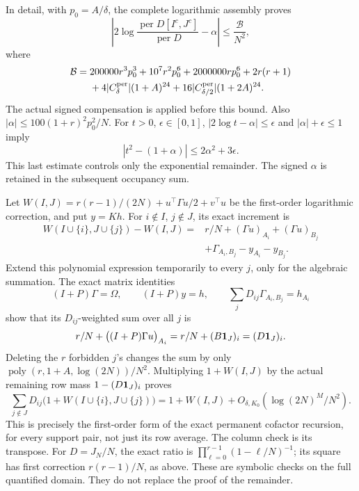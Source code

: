 In detail, with \(p_0=A/\delta\), the complete logarithmic
assembly proves
\[
 \left|2\log\frac{\operatorname{per}D[I^c,J^c]}
                       {\operatorname{per}D}-\alpha\right|
       \leq \frac{\mathcal B}{N^2},
\]
where
\[
 \begin{split}
 \mathcal B={}&200000r^3p_0^3+10^7r^2p_0^6
           +2000000rp_0^6+2r(r+1)\\
       &+4|C_\delta^{\rm per}|(1+A)^{24}
           +16|C_{\delta/2}^{\rm per}|(1+2A)^{24}.
 \end{split}
\]
The actual signed compensation is applied before this bound.
Also \(|\alpha|\leq100(1+r)^2p_0^2/N\).
For \(t>0\), \(\epsilon\in[0,1]\),
\(|2\log t-\alpha|\leq\epsilon\) and
\(|\alpha|+\epsilon\leq1\) imply
\[
 |t^2-(1+\alpha)|\leq2\alpha^2+3\epsilon .
\]
This last estimate controls only the exponential remainder.
The signed \(\alpha\) is retained in the subsequent occupancy sum.

\begin{remark}
Let \(W(I,J)=r(r-1)/(2N)+u^\top\Gamma u/2+v^\top u\)
be the first-order logarithmic correction, and put \(y=Kh\).
For \(i\notin I\), \(j\notin J\), its exact increment is
\[
 \begin{split}
 W(I\cup\{i\},J\cup\{j\})-W(I,J)
 ={}&r/N+(\Gamma u)_{A_i}+(\Gamma u)_{B_j}\\
    &+\Gamma_{A_i,B_j}-y_{A_i}-y_{B_j}.
 \end{split}
\]
Extend this polynomial expression temporarily to every \(j\),
only for the algebraic summation.
The exact matrix identities
\[
 (I+P)\Gamma=\Omega,\qquad (I+P)y=h,\qquad
 \sum_jD_{ij}\Gamma_{A_i,B_j}=h_{A_i}
\]
show that its \(D_{ij}\)-weighted sum over all \(j\) is
\[
 r/N+\bigl((I+P)\Gamma u\bigr)_{A_i}
             =r/N+(B\mathbf1_J)_i=(D\mathbf1_J)_i .
\]
Deleting the \(r\) forbidden \(j\)'s changes the sum by
only \(\operatorname{poly}(r,1+A,\log(2N))/N^2\).
Multiplying \(1+W(I,J)\) by the actual remaining row
mass \(1-(D\mathbf1_J)_i\) proves
\[
 \sum_{j\notin J}D_{ij}
       \bigl(1+W(I\cup\{i\},J\cup\{j\})\bigr)
 =1+W(I,J)+O_{\delta,K_0}(\log(2N)^M/N^2).
\]
This is precisely the first-order form of the exact
permanent cofactor recursion, for every support pair,
not just its row average. The column check is its transpose.
For \(D=J_N/N\), the exact ratio is
\(\prod_{\ell=0}^{r-1}(1-\ell/N)^{-1}\);
its square has first correction \(r(r-1)/N\), as above.
These are symbolic checks on the full quantified domain.
They do not replace the proof of the remainder.
\end{remark}
